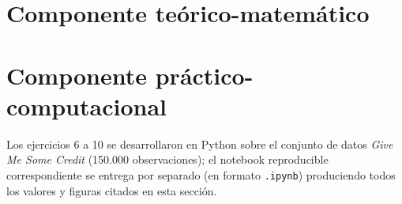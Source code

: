 \documentclass[11pt]{article}
\begin{document}


\tableofcontents
\newpage

\section{Componente teórico-matemático}






\newpage
\section{Componente práctico-computacional}
\label{sec:practico}

\noindent Los ejercicios 6 a 10 se desarrollaron en Python sobre el
conjunto de datos \emph{Give Me Some Credit} (150.000 observaciones);
el notebook reproducible correspondiente se entrega por separado (en
formato \texttt{.ipynb}) produciendo todos los valores y figuras citados en esta sección.






\end{document}
